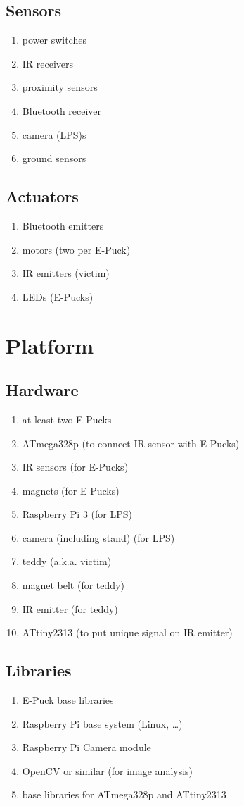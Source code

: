 \documentclass[a4paper,parskip,headheight=38pt]{scrartcl} %
\begin{document}
\subsection{Sensors}
\begin{enumerate}[label=\sensors]
\item power switches
\item IR receivers
\item proximity sensors
\item Bluetooth receiver
\item camera (LPS)s
\item ground sensors
\end{enumerate}

\subsection{Actuators}
\begin{enumerate}[label=\actuators]
\item Bluetooth emitters
\item motors (two per E-Puck)
\item IR emitters (victim)
\item LEDs (E-Pucks)
\end{enumerate}


\section{Platform}

\subsection{Hardware}
\begin{enumerate}[label=\hardware]
\item at least two E-Pucks
\item ATmega328p (to connect IR sensor with E-Pucks)
\item IR sensors (for E-Pucks)
\item magnets (for E-Pucks)
\item Raspberry Pi 3 (for LPS)
\item camera (including stand) (for LPS)
\item teddy (a.k.a. victim)
\item magnet belt (for teddy)
\item IR emitter (for teddy)
\item ATtiny2313 (to put unique signal on IR emitter)
\end{enumerate}

\subsection{Libraries}
\begin{enumerate}[label=\libs]
\item E-Puck base libraries
\item Raspberry Pi base system (Linux, \ldots)
\item Raspberry Pi Camera module
\item OpenCV or similar (for image analysis)
\item base libraries for ATmega328p and ATtiny2313
\end{enumerate}
\end{document}
